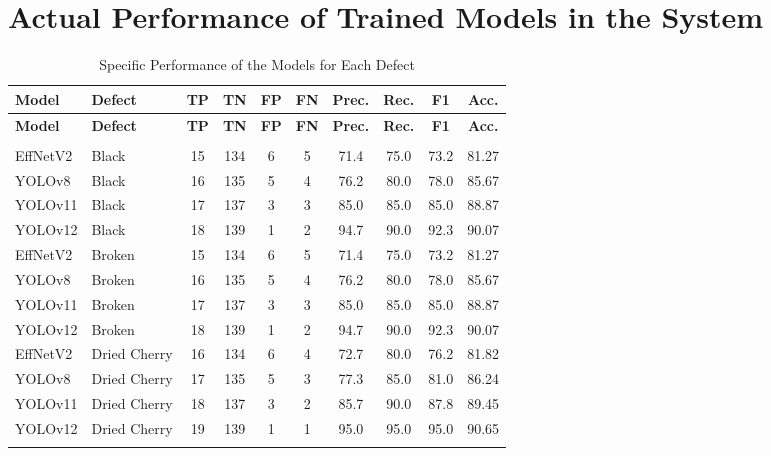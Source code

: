 \section{Actual Performance of Trained Models in the System}
\label{sec:actual_performance}
\begin{center}
	\footnotesize
	\setlength{\tabcolsep}{4pt}
	\begin{longtable}{@{}>{\raggedright}p{1.8cm}>{\raggedright}p{1.2cm}cccccccc@{}}
	\caption{Specific Performance of the Models for Each Defect}
	\label{tab:specific_performance}\\
	\toprule
	\textbf{Model} & \textbf{Defect} & \textbf{TP} & \textbf{TN} & \textbf{FP} & \textbf{FN} & \textbf{Prec.} & \textbf{Rec.} & \textbf{F1} & \textbf{Acc.} \\
	\midrule
	\endfirsthead
	\toprule
	\textbf{Model} & \textbf{Defect} & \textbf{TP} & \textbf{TN} & \textbf{FP} & \textbf{FN} & \textbf{Prec.} & \textbf{Rec.} & \textbf{F1} & \textbf{Acc.} \\
	\midrule
	\endhead
	\midrule
	\multicolumn{10}{r}{{Continued on next page}} \\
	\midrule
	\endfoot
	\bottomrule
	\endlastfoot
	
	EffNetV2      		& Black        & 15 & 134 & 6 & 5 & 71.4 & 75.0 & 73.2 & 81.27 \\
	YOLOv8               & Black        & 16 & 135 & 5 & 4 & 76.2 & 80.0 & 78.0 & 85.67 \\
	YOLOv11              & Black        & 17 & 137 & 3 & 3 & 85.0 & 85.0 & 85.0 & 88.87 \\
	YOLOv12              & Black        & 18 & 139 & 1 & 2 & 94.7 & 90.0 & 92.3 & 90.07 \\
	\addlinespace
	
	EffNetV2      		& Broken       & 15 & 134 & 6 & 5 & 71.4 & 75.0 & 73.2 & 81.27 \\
	YOLOv8               & Broken       & 16 & 135 & 5 & 4 & 76.2 & 80.0 & 78.0 & 85.67 \\
	YOLOv11              & Broken       & 17 & 137 & 3 & 3 & 85.0 & 85.0 & 85.0 & 88.87 \\
	YOLOv12              & Broken       & 18 & 139 & 1 & 2 & 94.7 & 90.0 & 92.3 & 90.07 \\
	\addlinespace
	
	EffNetV2      		& Dried Cherry & 16 & 134 & 6 & 4 & 72.7 & 80.0 & 76.2 & 81.82 \\
	YOLOv8               & Dried Cherry & 17 & 135 & 5 & 3 & 77.3 & 85.0 & 81.0 & 86.24 \\
	YOLOv11              & Dried Cherry & 18 & 137 & 3 & 2 & 85.7 & 90.0 & 87.8 & 89.45 \\
	YOLOv12              & Dried Cherry & 19 & 139 & 1 & 1 & 95.0 & 95.0 & 95.0 & 90.65 \\
	\addlinespace
	

\end{longtable}
\end{center}

